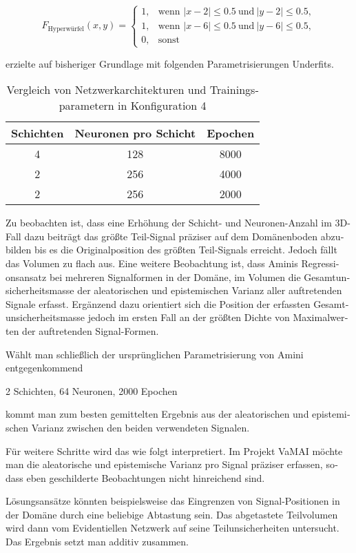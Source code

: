 \begin{otherlanguage}{ngerman}
\[
F_{\text{Hyperwürfel}}(x, y) =
\begin{cases}
1, & \text{wenn } |x - 2| \leq 0.5 \ \text{und} \ |y - 2| \leq 0.5, \\
1, & \text{wenn } |x - 6| \leq 0.5 \ \text{und} \ |y - 6| \leq 0.5, \\
0, & \text{sonst}
\end{cases}
\]

erzielte auf bisheriger Grundlage mit folgenden Parametrisierungen Underfits. 

\begin{table}[h!]
\centering
\begin{tabular}{|c|c|c|}
\hline
\textbf{Schichten} & \textbf{Neuronen pro Schicht} & \textbf{Epochen} \\
\hline
4 & 128 & 8000 \\
2 & 256 & 4000 \\
2 & 256 & 2000 \\
\hline
\end{tabular}
\caption{Vergleich von Netzwerkarchitekturen und Trainingsparametern in Konfiguration 4}
\end{table}

Zu beobachten ist, dass eine Erhöhung der Schicht- und Neuronen-Anzahl im 3D-Fall dazu beiträgt das größte Teil-Signal präziser auf dem Domänenboden abzubilden bis es die Originalposition des größten Teil-Signals erreicht. Jedoch fällt das Volumen zu flach aus. Eine weitere Beobachtung ist, dass Aminis Regressionsansatz bei mehreren Signalformen in der Domäne, im Volumen die Gesamtunsicherheitsmasse der aleatorischen und epistemischen Varianz aller auftretenden Signale erfasst. Ergänzend dazu orientiert sich die Position der erfassten Gesamtunsicherheitsmasse jedoch im ersten Fall an der größten Dichte von Maximalwerten der auftretenden Signal-Formen. 

Wählt man schließlich der ursprünglichen Parametrisierung von Amini entgegenkommend

2 Schichten, 64 Neuronen, 2000 Epochen 

kommt man zum besten gemittelten Ergebnis aus der aleatorischen und epistemischen Varianz zwischen den beiden verwendeten Signalen. 

Für weitere Schritte wird das wie folgt interpretiert. Im Projekt VaMAI möchte man die aleatorische und epistemische Varianz pro Signal präziser erfassen, sodass eben geschilderte Beobachtungen nicht hinreichend sind. 

Lösungsansätze könnten beispielsweise das Eingrenzen von Signal-Positionen in der Domäne durch eine beliebige Abtastung sein. Das abgetastete Teilvolumen wird dann vom Evidentiellen Netzwerk auf seine Teilunsicherheiten untersucht. Das Ergebnis setzt man additiv zusammen. 


\end{otherlanguage}
